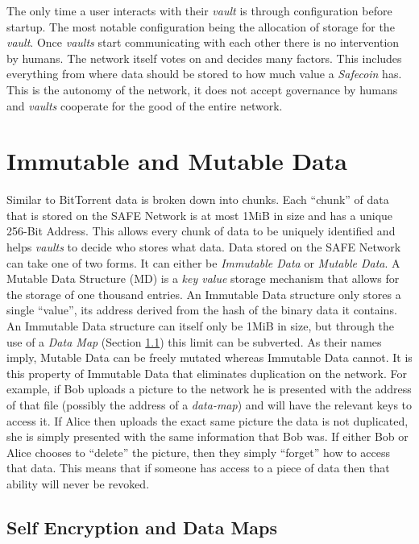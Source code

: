 The only time a user interacts with their \textit{vault} is through configuration before startup. The most notable configuration being the allocation of storage for the \textit{vault}. Once \textit{vaults} start communicating with each other there is no intervention by humans. The network itself votes on and decides many factors. This includes everything from where data should be stored to how much value a \textit{Safecoin} has. This is the autonomy of the network, it does not accept governance by humans and \textit{vaults} cooperate for the good of the entire network.

\section{Immutable and Mutable Data}

Similar to BitTorrent data is broken down into chunks. Each ``chunk'' of data that is stored on the SAFE Network is at most 1MiB in size and has a unique 256-Bit Address. This allows every chunk of data to be uniquely identified and helps \textit{vaults} to decide who stores what data. Data stored on the SAFE Network can take one of two forms. It can either be \textit{Immutable Data} or \textit{Mutable Data}. A Mutable Data Structure (MD) is a \textit{key value} storage mechanism that allows for the storage of one thousand entries. An Immutable Data structure only stores a single ``value'', its address derived from the hash of the binary data it contains. An Immutable Data structure can itself only be 1MiB in size, but through the use of a \textit{Data Map} (Section \ref{subsec:self-encryption-data-map}) this limit can be subverted. As their names imply, Mutable Data can be freely mutated whereas Immutable Data cannot. It is this property of Immutable Data that eliminates duplication on the network. For example, if Bob uploads a picture to the network he is presented with the address of that file (possibly the address of a \textit{data-map}) and will have the relevant keys to access it. If Alice then uploads the exact same picture the data is not duplicated, she is simply presented with the same information that Bob was. If either Bob or Alice chooses to ``delete'' the picture, then they simply ``forget'' how to access that data. This means that if someone has access to a piece of data then that ability will never be revoked.

\subsection{Self Encryption and Data Maps}
\label{subsec:self-encryption-data-map}

